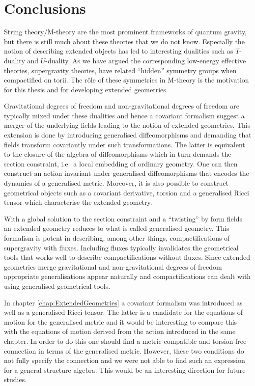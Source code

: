 \chapter{Conclusions}
String theory/M-theory are the most prominent frameworks of quantum gravity, but there is still much about these theories that we do not know. Especially the notion of describing extended objects has led to interesting dualities such as $T$-duality and $U$-duality. As we have argued the corresponding low-energy effective theories, supergravity theories, have related ``hidden'' symmetry groups when compactified on torii. The rôle of these symmetries in M-theory is the motivation for this thesis and for developing extended geometries. 

Gravitational degrees of freedom and non-gravitational degrees of freedom are typically mixed under these dualities and hence a covariant formalism suggest a merger of the underlying fields leading to the notion of extended geometries. This extension is done by introducing generalised diffeomorphisms and demanding that fields transform covariantly under such transformations. The latter is equivalent to the closure of the algebra of diffeomorphisms which in turn demands the section constraint, i.e.\ a local embedding of ordinary geometry. One can then construct an action invariant under generalised diffeomorphisms that encodes the dynamics of a generalised metric. Moreover, it is also possible to construct geometrical objects such as a covariant derivative, torsion and a generalised Ricci tensor which characterise the extended geometry. 

With a global solution to the section constraint and a ``twisting'' by form fields an extended geometry reduces to what is called generalised geometry. This formalism is potent in describing, among other things, compactifications of supergravity with fluxes. Including fluxes typically invalidates the geometrical tools that works well to describe compactifications without fluxes. Since extended geometries merge gravitational and non-gravitational degrees of freedom appropriate generalisations appear naturally and compactifications can dealt with using generalised geometrical tools. 

In chapter \ref{chap:ExtendedGeometries} a covariant formalism was introduced as well as a generalised Ricci tensor. The latter is a candidate for the equations of motion for the generalised metric and it would be interesting to compare this with the equations of motion derived from the action introduced in the same chapter. In order to do this one should find a metric-compatible and torsion-free connection in terms of the generalised metric. However, these two conditions do not fully specify the connection and we were not able to find such an expression for a general structure algebra. This would be an interesting direction for future studies. 

